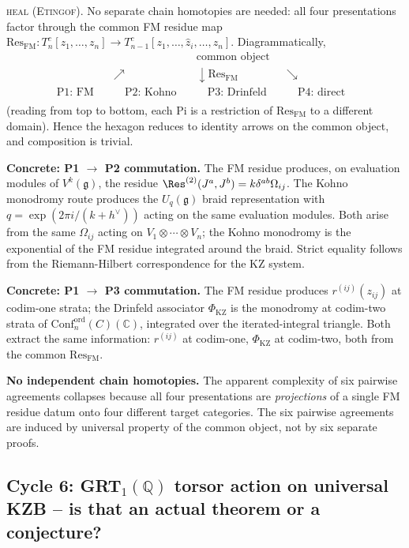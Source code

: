 \documentclass[12pt]{article}
\providecommand{\KZ}{\mathrm{KZ}}
\providecommand{\Confnord}[1][C]{\mathrm{Conf}_n^{\mathrm{ord}}(#1)}
\providecommand{\fg}{\mathfrak{g}}
\providecommand{\hv}{h^{\vee}}
\theoremstyle{definition}
\begin{document}
\textsc{heal (Etingof).}
No separate chain homotopies are needed: all four presentations
factor through the common FM residue map
$\mathrm{Res}_{\mathrm{FM}} \colon T^{c}_{n}[z_1,\dots,z_n]
 \to T^{c}_{n-1}[z_1,\dots,\hat z_i,\dots,z_n]$.
Diagrammatically,
\[
\begin{array}{cccccc}
   & & \text{common object} & & \\
   & \nearrow & \downarrow \mathrm{Res}_{\mathrm{FM}} & \searrow & \\
   \text{P1: FM} \quad & \quad \text{P2: Kohno} \quad & \quad \text{P3: Drinfeld} \quad & \quad \text{P4: direct} & \\
\end{array}
\]
(reading from top to bottom, each Pi is a restriction of
$\mathrm{Res}_{\mathrm{FM}}$ to a different domain).
Hence the hexagon reduces to identity arrows on the common
object, and composition is trivial.

\textbf{Concrete: P1 $\to$ P2 commutation.}
The FM residue produces, on evaluation modules of
$V^{k}(\fg)$, the residue
$\Res^{(2)}(J^a, J^b) = k\delta^{ab}\Omega_{ij}$.
The Kohno monodromy route produces the $U_q(\fg)$ braid
representation with $q = \exp(2\pi i/(k + \hv))$ acting on
the same evaluation modules.  Both arise from the same
$\Omega_{ij}$ acting on $V_1 \otimes \cdots \otimes V_n$;
the Kohno monodromy is the exponential of the FM residue
integrated around the braid.  Strict equality follows from
the Riemann-Hilbert correspondence for the KZ system.

\textbf{Concrete: P1 $\to$ P3 commutation.}
The FM residue produces $r^{(ij)}(z_{ij})$ at codim-one
strata; the Drinfeld associator $\Phi_{\KZ}$ is the
monodromy at codim-two strata of $\Confnord(\mathbb{C})$,
integrated over the iterated-integral triangle.  Both
extract the same information: $r^{(ij)}$ at codim-one,
$\Phi_{\KZ}$ at codim-two, both from the common
$\mathrm{Res}_{\mathrm{FM}}$.

\textbf{No independent chain homotopies.}
The apparent complexity of six pairwise agreements collapses
because all four presentations are \emph{projections} of a
single FM residue datum onto four different target categories.
The six pairwise agreements are induced by universal property
of the common object, not by six separate proofs.

\subsection{Cycle 6: GRT$_1(\mathbb{Q})$ torsor action on
universal KZB -- is that an actual theorem or a conjecture?}
\label{ssec:cycle-6}
\end{document}
